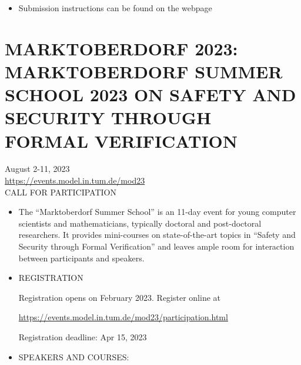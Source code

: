 \documentclass[prodmode,acmtecs]{acmsmall} %
\begin{document}
\begin{itemize}
\item  Submission instructions can be found on the webpage 
 
\end{itemize}\section{MARKTOBERDORF 2023: MARKTOBERDORF SUMMER SCHOOL 2023 ON SAFETY AND SECURITY THROUGH FORMAL VERIFICATION}\label{MARKTOBERDORF2023}  August 2-11, 2023\\ 
  \href{https://events.model.in.tum.de/mod23}{https://events.model.in.tum.de/mod23}\\ 
CALL FOR PARTICIPATION 

\begin{itemize}\item  The ``Marktoberdorf Summer School'' is an 11-day event for young computer scientists and mathematicians, typically doctoral and post-doctoral researchers. It provides mini-courses on state-of-the-art topics in ``Safety and Security through Formal Verification'' and leaves ample room for interaction between participants and speakers. 
 
\item  REGISTRATION 
 
  Registration opens on February 2023. Register online at 
 
  \href{https://events.model.in.tum.de/mod23/participation.html}{https://events.model.in.tum.de/mod23/participation.html} 
 
Registration deadline: Apr 15, 2023 
 
\item  SPEAKERS AND COURSES: 
 

\end{itemize}
\end{document}
